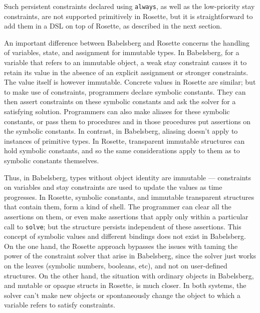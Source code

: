 \documentclass{sigplanconf}
\begin{document}
Such persistent constraints declared using \verb|always|, as well as
the low-priority stay constraints, are not supported primitively in
Rosette, but it is straightforward to add them in a DSL on top of
Rosette, as described in the next section.

An important difference between Babelsberg and Rosette concerns the
handling of variables, state, and assignment for immutable types.  In
Babelsberg, for a variable that refers to an immutable object, a weak stay
constraint causes it to retain its value in the absence of an explicit
assignment or stronger constraints.  The value itself is however immutable.
Concrete values in Rosette are similar; but to make use of constraints,
programmers declare symbolic constants.  They can then assert constraints
on these symbolic constants and ask the solver for a satisfying solution.
Programmers can also make aliases for these symbolic constants, or pass
them to procedures and in those procedures put assertions on the symbolic
constants.  In contrast, in Babelsberg, aliasing doesn't apply to instances
of primitive types.  In Rosette, transparent immutable structures can hold
symbolic constants, and so the same considerations apply to them as to
symbolic constants themselves.  

Thus, in Babelsberg, types without object identity are immutable ---
constraints on variables and stay constraints are used to update the values
as time progresses.  In Rosette, symbolic constants, and immutable
transparent structures that contain them, form a kind of shell.  The
programmer can clear all the assertions on them, or even make assertions
that apply only within a particular call to \verb|solve|; but the structure
persists independent of these assertions.
This concept of symbolic
values and different bindings does not exist in Babelsberg.  On the one
hand, the Rosette approach bypasses the issues with taming the power of the
constraint solver that arise in Babelsberg, since the solver just works on
the leaves (symbolic numbers, booleans, etc), and not on user-defined
structures.  On the other hand, the situation with ordinary objects in
Babelsberg, and mutable or opaque structs in Rosette, is much closer.  In
both systems, the solver can't make new objects or spontaneously change the
object to which a variable refers to satisfy constraints.


\end{document}
